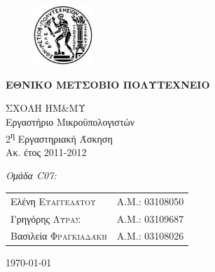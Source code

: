 \begin{titlepage}
\begin{center}
\begin{figure}[h] 
     \includegraphics[width=0.2\textwidth]{title/ntua_logo}
\end{figure}
\vspace{1cm}
\begin{LARGE}\textbf{ΕΘΝΙΚΟ ΜΕΤΣΟΒΙΟ ΠΟΛΥΤΕΧΝΕΙΟ\\[1.5cm]}\end{LARGE}
\begin{Large}
ΣΧΟΛΗ ΗΜ\&ΜΥ\\
Εργαστήριο Μικροϋπολογιστών\\[2cm]
2\textsuperscript{η} Εργαστηριακή Άσκηση\\
Ακ. έτος 2011-2012\\
\end{Large}
\vfill
\begin{flushright}
\Large \textit{Ομάδα C07:}\\[1cm]
\begin{tabular}{l r}
{Ελένη \textsc{Ευαγγελάτου}}&
{Α.Μ.: 03108050}\\
{Γρηγόρης \textsc{Λύρας}}&
{Α.Μ.: 03109687}\\
{Βασιλεία \textsc{Φραγκιαδάκη}}&
{Α.Μ.: 03108026}\\
\end{tabular}
\end{flushright}

\large\today\\
\end{center}
\end{titlepage}


